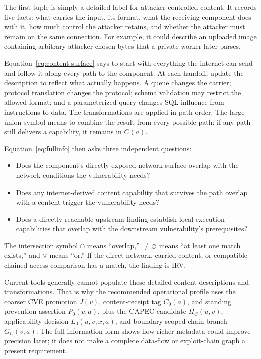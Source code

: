 \documentclass[11pt]{article}
\begin{document}
\begin{plain}
The first tuple is simply a detailed label for attacker-controlled content. It
records five facts: what carries the input, its format, what the receiving
component does with it, how much control the attacker retains, and whether the
attacker must remain on the same connection. For example, it could describe an
uploaded image containing arbitrary attacker-chosen bytes that a private worker
later parses.

Equation~\ref{eq:content-surface} says to start with everything the internet can
send and follow it along every path to the component. At each handoff, update
the description to reflect what actually happens. A queue changes the carrier;
protocol translation changes the protocol; schema validation may restrict the
allowed format; and a parameterized query changes SQL influence from
instructions to data. The transformations are applied in path order. The large
union symbol means to combine the result from every possible path: if any path
still delivers a capability, it remains in $C(a)$.

Equation~\ref{eq:fullinfo} then asks three independent questions:
\begin{itemize}[leftmargin=1.35em,nosep]
\item Does the component's directly exposed network surface overlap with the
  network conditions the vulnerability needs?
\item Does any internet-derived content capability that survives the path
  overlap with a content trigger the vulnerability needs?
\item Does a directly reachable upstream finding establish local execution
  capabilities that overlap with the downstream vulnerability's prerequisites?
\end{itemize}
The intersection symbol $\cap$ means ``overlap,'' $\neq\varnothing$ means ``at
least one match exists,'' and $\lor$ means ``or.'' If the direct-network,
carried-content, or compatible chained-access comparison has a match, the
finding is IRV.

Current tools generally cannot populate these detailed content descriptions and
transformations. That is why the recommended operational profile uses the
coarser CVE promotion $J(v)$, content-receipt tag $C_0(a)$, and standing
prevention assertion $P_0(v,a)$, plus the CAPEC candidate $H_C(u,v)$,
applicability decision $L_0(u,v,x,a)$, and boundary-scoped chain branch
$G_C(v,a)$. The full-information form shows
how richer metadata could improve precision later; it does not make a complete
data-flow or exploit-chain graph a present requirement.
\end{plain}
\end{document}
